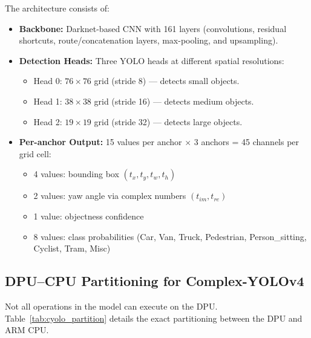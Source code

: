 \documentclass[12pt, a4paper]{report}
\begin{document}
The architecture consists of:
\begin{itemize}[nosep]
    \item \textbf{Backbone:} Darknet-based CNN with 161 layers (convolutions, residual shortcuts, route/concatenation layers, max-pooling, and upsampling).
    \item \textbf{Detection Heads:} Three YOLO heads at different spatial resolutions:
    \begin{itemize}[nosep]
        \item Head 0: $76 \times 76$ grid (stride 8) --- detects small objects.
        \item Head 1: $38 \times 38$ grid (stride 16) --- detects medium objects.
        \item Head 2: $19 \times 19$ grid (stride 32) --- detects large objects.
    \end{itemize}
    \item \textbf{Per-anchor Output:} 15 values per anchor $\times$ 3 anchors = 45 channels per grid cell:
    \begin{itemize}[nosep]
        \item 4 values: bounding box $(t_x, t_y, t_w, t_h)$
        \item 2 values: yaw angle via complex numbers $(t_{im}, t_{re})$
        \item 1 value: objectness confidence
        \item 8 values: class probabilities (Car, Van, Truck, Pedestrian, Person\_sitting, Cyclist, Tram, Misc)
    \end{itemize}
\end{itemize}

\subsection{DPU--CPU Partitioning for Complex-YOLOv4}

Not all operations in the model can execute on the DPU. Table~\ref{tab:cyolo_partition} details the exact partitioning between the DPU and ARM CPU.
\end{document}
